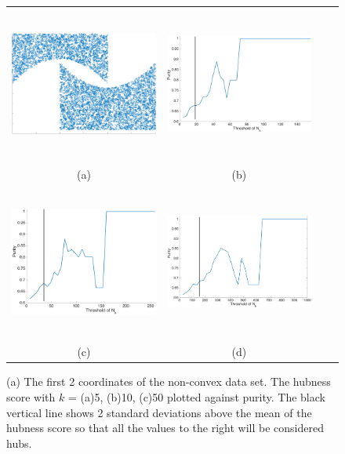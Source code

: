 \documentclass[graybox]{svmult}
\begin{document}
\begin{figure}
\centering
    \begin{tabular}{cccc}
        \includegraphics[width=2.5in,height=2in]{../fig/SQdata.png} &
        \includegraphics[width=2.5in,height=2in]{../fig/SQmoons-dim60-6000-k5-PurityHubness.png} \\
        {\scriptsize (a)} &  {\scriptsize (b)} \\
        \includegraphics[width=2.5in,height=2in]{../fig/SQmoons-dim60-6000-k10-PurityHubness.png}&
        \includegraphics[width=2.5in,height=2in]{../fig/SQmoons-dim60-6000-k50-PurityHubness.png}\\
        {\scriptsize (c)} &  {\scriptsize (d)} 
      \end{tabular}
      \caption{(a) The first 2 coordinates of the non-convex data set. The hubness score with $k$ = (a)5, (b)10, (c)50 plotted against purity. The black vertical line shows 2 standard deviations above the mean of the hubness score so that all the values to the right will be considered hubs. }\label{fig:purity}
\end{figure}
\end{document}
